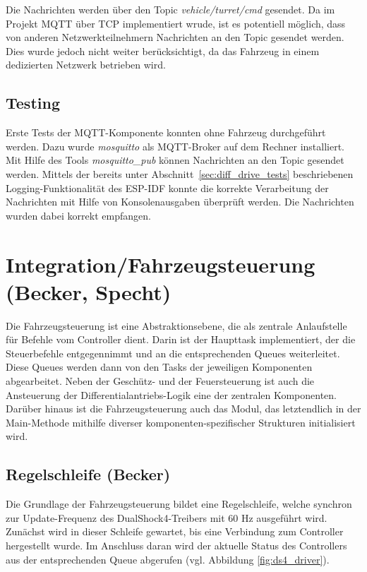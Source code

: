 Die Nachrichten werden über den Topic \textit{vehicle/turret/cmd} gesendet. Da im Projekt MQTT über TCP implementiert wrude, ist es potentiell möglich, dass von anderen Netzwerkteilnehmern Nachrichten an den Topic gesendet werden. Dies wurde jedoch nicht weiter berücksichtigt, da das Fahrzeug in einem dedizierten Netzwerk betrieben wird. \newline

\subsection{Testing}

Erste Tests der MQTT-Komponente konnten ohne Fahrzeug durchgeführt werden. Dazu wurde \textit{mosquitto} als MQTT-Broker auf dem Rechner installiert. Mit Hilfe des Tools \textit{mosquitto\_pub} können Nachrichten an den Topic gesendet werden. Mittels der bereits unter Abschnitt~\ref{sec:diff_drive_tests} beschriebenen Logging-Funktionalität des ESP-IDF konnte die korrekte Verarbeitung der Nachrichten mit Hilfe von Konsolenausgaben überprüft werden. Die Nachrichten wurden dabei korrekt empfangen.

\section{Integration/Fahrzeugsteuerung (Becker, Specht) \label{sec:esp32_integration}}

Die Fahrzeugsteuerung ist eine Abstraktionsebene, die als zentrale Anlaufstelle für Befehle vom Controller dient. Darin ist der Haupttask implementiert, der die Steuerbefehle entgegennimmt und an die entsprechenden Queues weiterleitet. Diese Queues werden dann von den Tasks der jeweiligen Komponenten abgearbeitet. Neben der Geschütz- und der Feuersteuerung ist auch die Ansteuerung der Differentialantriebs-Logik eine der zentralen Komponenten. Darüber hinaus ist die Fahrzeugsteuerung auch das Modul, das letztendlich in der Main-Methode mithilfe diverser komponenten-spezifischer Strukturen initialisiert wird. \newline

\subsection{Regelschleife (Becker)} \label{sec:esp32_control_loop}

Die Grundlage der Fahrzeugsteuerung bildet eine Regelschleife, welche synchron zur Update-Frequenz des DualShock4-Treibers mit 60 Hz ausgeführt wird. 
Zunächst wird in dieser Schleife gewartet, bis eine Verbindung zum Controller hergestellt wurde.
Im Anschluss daran wird der aktuelle Status des Controllers aus der entsprechenden Queue abgerufen (vgl. Abbildung \ref{fig:ds4_driver}).

